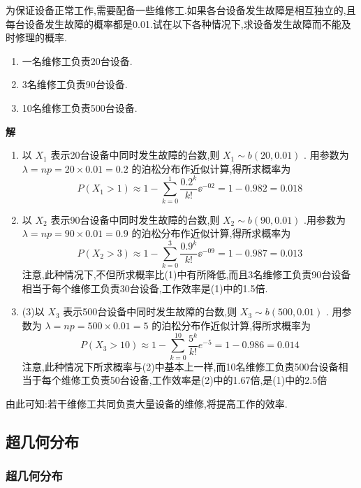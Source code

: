 \begin{example}
	为保证设备正常工作,需要配备一些维修工.如果各台设备发生故障是相互独立的,且每台设备发生故障的概率都是0.01.试在以下各种情况下,求设备发生故障而不能及时修理的概率.
	
	\begin{enumerate}
		\item 一名维修工负责20台设备.
		\item 3名维修工负责90台设备.
		\item 10名维修工负责500台设备.
	\end{enumerate}
	
	\textbf{解}
	\begin{enumerate}
		\item 以 $ X_{1} $ 表示20台设备中同时发生故障的台数,则 $ X_{1} \sim b(20,0.01) $ .
		用参数为 $ \lambda=n p=20 \times 0.01=0.2 $ 的泊松分布作近似计算,得所求概率为
		\[
		P\left(X_{1}>1\right) \approx 1-\sum_{k=0}^{1} \frac{0.2^{k}}{k !} \ee ^{-02}=1-0.982=0.018
		\]
		\item 以 $ X_{2} $ 表示90台设备中同时发生故障的台数,则 $ X_{2} \sim b(90,0.01) $ .用参数为 $ \lambda=n p=90 \times 0.01=0.9 $ 的泊松分布作近似计算,得所求概率为
		\[
		P\left(X_{2}>3\right) \approx 1-\sum_{k=0}^{3} \frac{0.9^{k}}{k !} \ee ^{-09}=1-0.987=0.013
		\]
		注意,此种情况下,不但所求概率比(1)中有所降低,而且3名维修工负责90台设备相当于每个维修工负责30台设备,工作效率是(1)中的1.5倍.
		\item 
		(3)以 $ X_{3} $ 表示500台设备中同时发生故障的台数,则 $ X_{3} \sim b(500,0.01) $ .
		用参数为 $ \lambda=n p=500 \times 0.01=5 $ 的泊松分布作近似计算,得所求概率为
		\[
		P\left(X_{3}>10\right) \approx 1-\sum_{k=0}^{10} \frac{5^{k}}{k !} e^{-5}=1-0.986=0.014
		\]
		注意,此种情况下所求概率与(2)中基本上一样,而10名维修工负责500台设备相当于每个维修工负责50台设备,工作效率是(2)中的1.67倍,是(1)中的2.5倍
	\end{enumerate}
	
	由此可知:若干维修工共同负责大量设备的维修,将提高工作的效率.
	
\end{example}

\subsection{超几何分布}

\subsubsection{超几何分布}

